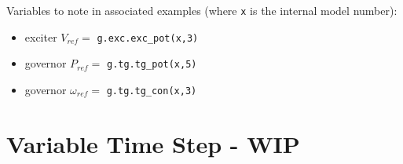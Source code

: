 Variables to note in associated examples (where \verb|x| is the internal model number):
\begin{itemize}
\item exciter $V_{ref} = $ \verb|g.exc.exc_pot(x,3)|
\item governor $P_{ref} = $ \verb|g.tg.tg_pot(x,5)|
\item governor $\omega_{ref} = $ \verb|g.tg.tg_con(x,3)|
\end{itemize}


\section{Variable Time Step - WIP}
